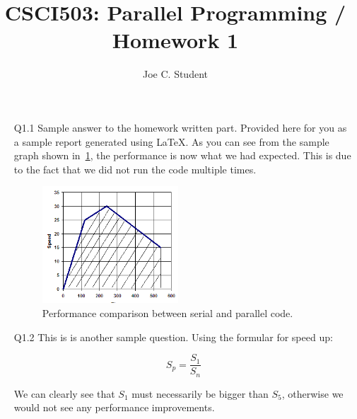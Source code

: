 \documentclass[11pt]{article}
\title{CSCI503: Parallel Programming / Homework 1}
\author{Joe C. Student}
\begin{document}
\maketitle

\begin{enumerate}

\item[Q1.1] Sample answer to the homework written part.  Provided here for you as a sample report generated using {\LaTeX}.  As you can see from the sample graph shown in~\ref{fig:sample}, the performance is now what we had expected.  This is due to the fact that we did not run the code multiple times.

\begin{figure}[htbp]
   \centering
   \includegraphics[width=2in]{example.png} 
   \caption{Performance comparison between serial and parallel code.}
   \label{fig:sample}
\end{figure}

\item[Q1.2] This is is another sample question.  Using the formular for speed up:

\begin{equation}
S_p = \frac{S_1}{S_n} 
\end{equation}


We can clearly see that $S_1$ must necessarily be bigger than $S_5$, otherwise we would not see any performance improvements.

\end{enumerate}
\end{document}
